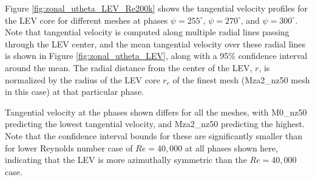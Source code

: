 Figure \ref{fig:zonal_utheta_LEV_Re200k} shows the tangential velocity profiles for the LEV core for different meshes at phases  $\psi = 255^\circ$,  $\psi = 270^\circ$, and  $\psi = 300^\circ$. 
Note that tangential velocity is computed along multiple radial lines passing through the LEV center, and the mean tangential velocity over these radial lines is shown in Figure \ref{fig:zonal_utheta_LEV}, along with a 95\% confidence interval around the mean.
The radial distance from the center of the LEV, $r$, is normalized by the radius of the LEV core $r_c$ of the finest mesh (Mza2\_nz50 mesh in this case) at that particular phase.

Tangential velocity at the phases shown differs for all the meshes, with M0\_nz50 predicting the lowest tangential velocity, and Mza2\_nz50 predicting the highest.
Note that the confidence interval bounds for these are significantly smaller than for lower Reynolds number case of $Re=40,000$ at all phases shown here, indicating that the LEV is more azimuthally symmetric than the $Re=40,000$ case.


